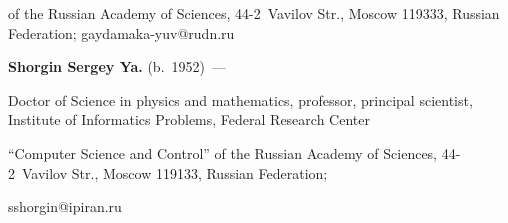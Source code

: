 of the Russian Academy of Sciences, 44-2~Vavilov Str., Moscow 119333, Russian Federation; \mbox{gaydamaka-yuv@rudn.ru}





\vspace*{6pt}





\noindent


\textbf{Shorgin Sergey Ya.} (b.\ 1952)~--- 


Doctor of Science in physics and mathematics, professor, principal scientist, Institute of Informatics Problems, Federal Research Center 


``Computer Science and Control'' of the Russian Academy of Sciences, 44-2~Vavilov Str., Moscow 119133, Russian Federation; 


\mbox{sshorgin@ipiran.ru}











   


\label{end\stat}





\renewcommand{\bibname}{\protect\rm Литература} 


   



